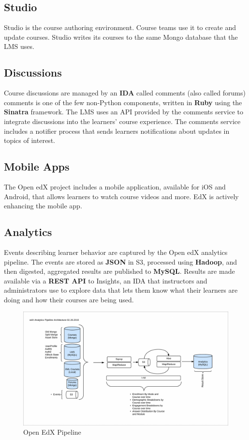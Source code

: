 \subsection{Studio}
Studio is the course authoring environment. Course teams use it to create and update courses.
Studio writes its courses to the same Mongo database that the LMS uses.

\subsection{Discussions}
Course discussions are managed by an \textbf{IDA} called comments (also called forums) comments is one
of the few non-Python components, written in \textbf{Ruby} using the \textbf{Sinatra} framework. The LMS uses
an API provided by the comments service to integrate discussions into the learners’ course
experience.\newline
The comments service includes a notifier process that sends learners notifications about updates in
topics of interest.\newline

\subsection{Mobile Apps}
The Open edX project includes a mobile application, available for iOS and Android, that allows
learners to watch course videos and more. EdX is actively enhancing the mobile app.

\subsection{Analytics}
Events describing learner behavior are captured by the Open edX analytics pipeline. The events are
stored as \textbf{JSON} in S3, processed using \textbf{Hadoop}, and then digested, aggregated results are published
to \textbf{MySQL}. Results are made available via a \textbf{REST API} to Insights, an IDA that instructors and
administrators use to explore data that lets them know what their learners are doing and how their
courses are being used.

\begin{figure}
	\includegraphics[width=\linewidth]{images/edx_pipeline_0.png}
	\caption{Open EdX Pipeline}
	\label{Fig.2:Open edX Pipeline}
\end{figure}


